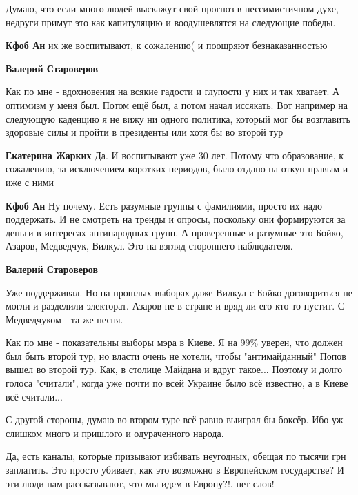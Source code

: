 \begin{itemize}
\begin{itemize}
Думаю, что если много людей выскажут свой прогноз в пессимистичном духе,
недруги примут это как капитуляцию и воодушевлятся на следующие победы.

\textbf{Кфоб Ан} их же воспитывают, к сожалению( и поощряют безнаказанностью

\textbf{Валерий Староверов} 

Как по мне - вдохновения на всякие гадости и глупости у них и так хватает. А
оптимизм у меня был. Потом ещё был, а потом начал иссякать. Вот например на
следующую каденцию я не вижу ни одного политика, который мог бы возглавить
здоровые силы и пройти в президенты или хотя бы во второй тур


\textbf{Екатерина Жарких} Да. И воспитывают уже 30 лет. Потому что образование, к сожалению, за исключением коротких периодов, было отдано на откуп правым и иже с ними

\textbf{Кфоб Ан} Ну почему. Есть разумные группы с фамилиями, просто их надо поддержать. И не смотреть на тренды и опросы, поскольку они формируются за деньги в интересах антинародных групп. А проверенные и разумные это Бойко, Азаров, Медведчук, Вилкул. Это на взгляд стороннего наблюдателя.

\textbf{Валерий Староверов} 

Уже поддерживал. Но на прошлых выборах даже Вилкул с Бойко договориться не
могли и разделили электорат. Азаров не в стране и вряд ли его кто-то пустит. С
Медведчуком - та же песня.

Как по мне - показательны выборы мэра в Киеве. Я на 99\% уверен, что должен был
быть второй тур, но власти очень не хотели, чтобы "антимайданный" Попов вышел
во второй тур. Как, в столице Майдана и вдруг такое... Поэтому и долго голоса
"считали", когда уже почти по всей Украине было всё известно, а в Киеве всё
считали...

С другой стороны, думаю во втором туре всё равно выиграл бы боксёр. Ибо уж
слишком много и пришлого и одураченного народа.

\end{itemize} %


Да, есть каналы, которые призывают избивать неугодных, обещая по тысячи грн
заплатить. Это просто убивает, как это возможно в Европейском государстве? И
эти люди нам рассказывают, что мы идем в Европу?!. нет слов!


\end{itemize}
